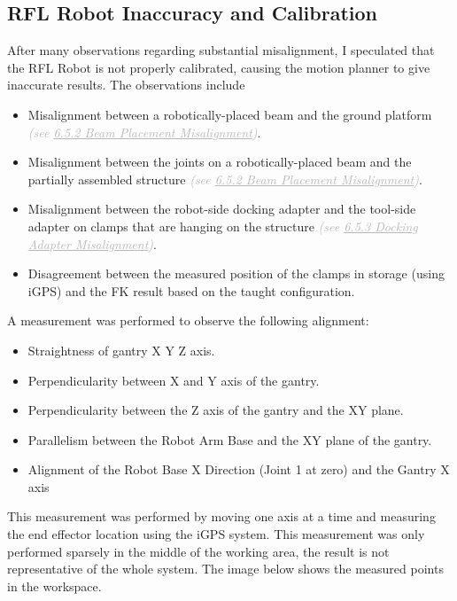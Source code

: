 \subsection{RFL Robot Inaccuracy and Calibration}

After many observations regarding substantial misalignment, I speculated that the RFL Robot is not properly calibrated, causing the motion planner to give inaccurate results. The observations include

\begin{itemize}
	\item Misalignment between a robotically-placed beam and the ground platform \textit{\textcolor[HTML]{B7B7B7}{(see \uline{6.5.2 Beam Placement Misalignment})}}.

	\item Misalignment between the joints on a robotically-placed beam and the partially assembled structure \textit{\textcolor[HTML]{B7B7B7}{(see \uline{6.5.2 Beam Placement Misalignment})}}.

	\item Misalignment between the robot-side docking adapter and the tool-side adapter on clamps that are hanging on the structure \textit{\textcolor[HTML]{B7B7B7}{(see \uline{6.5.3 Docking Adapter Misalignment})}}.

	\item Disagreement between the measured position of the clamps in storage (using iGPS) and the FK result based on the taught configuration.

\end{itemize}
A measurement was performed to observe the following alignment:

\begin{itemize}
	\item Straightness of gantry X Y Z axis.

	\item Perpendicularity between X and Y axis of the gantry.

	\item Perpendicularity between the Z axis of the gantry and the XY plane.

	\item Parallelism between the Robot Arm Base and the XY plane of the gantry.

	\item Alignment of the Robot Base X Direction (Joint 1 at zero) and the Gantry X axis

\end{itemize}
This measurement was performed by moving one axis at a time and measuring the end effector location using the iGPS system. This measurement was only performed sparsely in the middle of the working area, the result is not representative of the whole system. The image below shows the measured points in the workspace.

